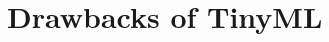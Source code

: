 \documentclass[../main]{subfiles}
\begin{document}
\chapter{Drawbacks of TinyML} \label{chp:}
\end{document}

